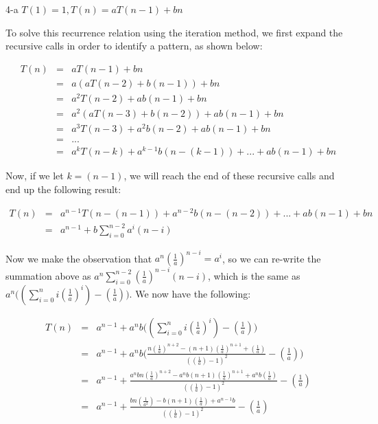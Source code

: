 \documentclass[11pt]{article}
\begin{document}
\begin{prob}{4-a}
$T(1) = 1, T(n) = aT(n-1) + bn$
\end{prob}
\begin{sol} 

To solve this recurrence relation using the iteration method, we first expand the recursive calls in order to identify a pattern, as shown below:

\begin{eqnarray*}
T(n) & = & aT(n-1) + bn \\
& = & a(aT(n-2) + b(n-1)) + bn \\
& = & a^2T(n-2) + ab(n-1) + bn\\
& = & a^2(aT(n-3) + b(n-2)) + ab(n-1) + bn\\
& = & a^3T(n-3) + a^2b(n-2) + ab(n-1) + bn \\
& = & ... \\
& = & a^kT(n-k) + a^{k-1}b(n-(k-1)) + ... + ab(n-1) + bn
\end{eqnarray*}

Now, if we let $k = (n-1)$, we will reach the end of these recursive calls and end up the following result:

\begin{eqnarray*}
T(n) & = & a^{n-1}T(n-(n-1)) + a^{n-2}b(n-(n-2)) + ... + ab(n-1) + bn \\
& = & a^{n-1} + b\sum_{i=0}^{n-2} a^i(n-i)
\end{eqnarray*}

Now we make the observation that $a^n(\frac{1}{a})^{n-i} = a^{i}$, so we can re-write the summation above as $a^{n}\sum_{i=0}^{n-2} (\frac{1}{a})^{n-i}(n-i)$, which is the same as $a^{n}\Big((\sum_{i=0}^{n} i(\frac{1}{a})^i) - (\frac{1}{a})\Big)$. We now have the following:

\begin{eqnarray*}
T(n) & = & a^{n-1} + a^{n}b\Big((\sum_{i=0}^{n} i(\frac{1}{a})^i) - (\frac{1}{a})\Big)\\
& = & a^{n-1} + a^{n}b\Big(\frac{n(\frac{1}{a})^{n+2} - (n+1)(\frac{1}{a})^{n+1} + (\frac{1}{a})}{((\frac{1}{a}) - 1)^2} - (\frac{1}{a})\Big) \\
& = & a^{n-1} + \frac{a^{n}bn(\frac{1}{a})^{n+2} - a^{n}b(n+1)(\frac{1}{a})^{n+1} + a^{n}b(\frac{1}{a})}{((\frac{1}{a}) - 1)^2} - (\frac{1}{a}) \\
& = & a^{n-1} + \frac{bn(\frac{1}{a^2}) - b(n+1)(\frac{1}{a}) + a^{n - 1}b}{((\frac{1}{a}) - 1)^2} - (\frac{1}{a})
\end{eqnarray*}


\end{sol}
\end{document}
